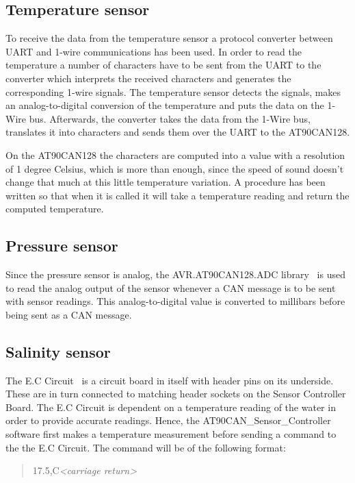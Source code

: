 \subsection{Temperature sensor}
To receive the data from the temperature sensor a protocol converter between UART and 1-wire communications has been used. In order to read the temperature a number of characters have to be sent from the UART to the converter which interprets the received characters and generates the corresponding 1-wire signals. The temperature sensor detects the signals, makes an analog-to-digital conversion of the temperature and puts the data on the 1-Wire bus. Afterwards, the converter takes the data from the 1-Wire bus, translates it into characters and sends them over the UART to the AT90CAN128. 

On the AT90CAN128 the characters are computed into a value with a resolution of 1 degree Celsius, which is more than enough, since the speed of sound doesn't change that much at this little temperature variation. A procedure has been written so that when it is called it will take a temperature reading and return the computed temperature.

\subsection{Pressure sensor}
Since the pressure sensor is analog, the AVR.AT90CAN128.ADC library~\cite{web:naiad_git} is used to read the analog output of the sensor whenever a CAN message is to be sent with sensor readings. This analog-to-digital value is converted to millibars before being sent as a CAN message. 


\subsection{Salinity sensor}
The E.C Circuit~\cite{web:ec_circuit} is a circuit board in itself with header pins on its underside. These are in turn connected to matching header sockets on the Sensor Controller Board. \newline
The E.C Circuit is dependent on a temperature reading of the water in order to provide accurate readings. Hence, the AT90CAN\_Sensor\_Controller software first makes a temperature measurement before sending a command to the the E.C Circuit. The command will be of the following format:

\begin{quote}
17.5,C\emph{<carriage return>}
\end{quote}

